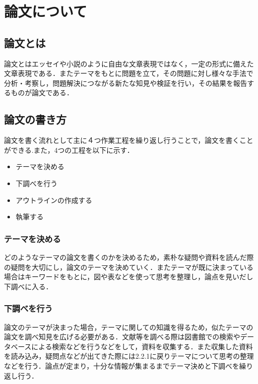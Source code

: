 \documentclass[a4j,12pt]{jarticle}
\begin{document}
\section{論文について}
\subsection{論文とは}
論文とはエッセイや小説のように自由な文章表現ではなく，一定の形式に備えた文章表現である．またテーマをもとに問題を立て，その問題に対し様々な手法で分析・考察し，問題解決につながる新たな知見や検証を行い，その結果を報告するものが論文である\cite{ren1}．

\subsection{論文の書き方}
論文を書く流れとして主に４つ作業工程を繰り返し行うことで，論文を書くことができる.また，4つの工程を以下に示す．
\begin{itemize}
  \item テーマを決める
  \item 下調べを行う
  \item アウトラインの作成する
  \item 執筆する
\end{itemize}
\subsubsection{テーマを決める}
どのようなテーマの論文を書くのかを決めるため，素朴な疑問や資料を読んだ際の疑問を大切にし，論文のテーマを決めていく．またテーマが既に決まっている場合はキーワードをもとに，図や表などを使って思考を整理し，論点を見いだし下調べに入る．
\newpage
\subsubsection{下調べを行う}
論文のテーマが決まった場合，テーマに関しての知識を得るため，似たテーマの論文を調べ知見を広げる必要がある．文献等を調べる際は図書館での検索やデータベースによる検索などを行うなどをして，資料を収集する．また収集した資料を読み込み，疑問点などが出てきた際には2.2.1に戻りテーマについて思考の整理などを行う．論点が定まり，十分な情報が集まるまでテーマ決めと下調べを繰り返し行う．
\newpage
\end{document}
